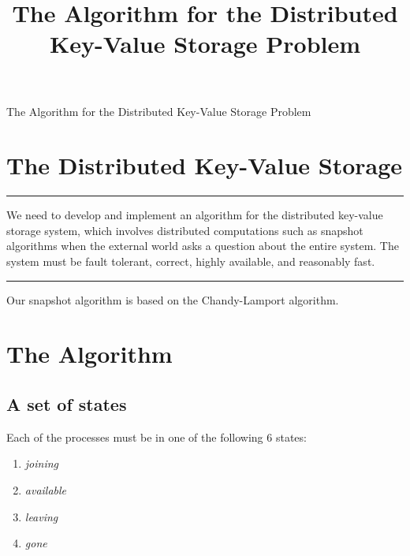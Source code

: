 \documentclass[11pt]{article}
\newenvironment{problem}[1]{
\medskip \hrule \medskip
\noindent {\bf Problem #1.}
}{
\medskip \hrule \medskip
}
\begin{document}
\title{The Algorithm for the Distributed Key-Value Storage Problem}
\author{
\and
{}
}

\pagestyle{fancy}


\vspace*{0.1in}
\begin{center} \Large The Algorithm for the Distributed Key-Value Storage Problem \end{center}

\section{The Distributed Key-Value Storage}
\begin{problem}{Statement}
We need to develop and implement an algorithm for the distributed key-value storage system, which involves distributed computations such as snapshot algorithms when the external world asks a question about the entire system. The system must be fault tolerant, correct, highly available, and reasonably fast.
\end{problem}

Our snapshot algorithm is based on the Chandy-Lamport algorithm.


\section{The Algorithm}
\subsection{A set of states}
Each of the processes must be in one of the following 6 states:
\newcommand{\numStates}{4}
\newcommand{\joining}{\textit{joining} }
\newcommand{\available}{\textit{available} }
\newcommand{\leaving}{\textit{leaving} }
\newcommand{\gone}{\textit{gone} }
\newcommand{\red}{\textit{gathering\_facts} }
\newcommand{\white}{\textit{backing\_up} }
\begin{enumerate}
\item \joining
\item \available
\item \leaving
\item \gone
\end{enumerate}
\end{document}
